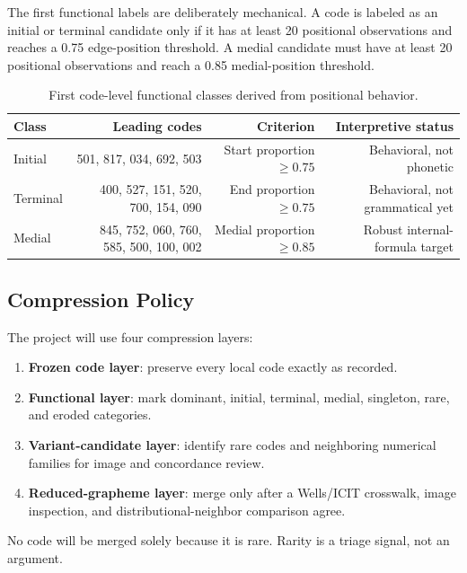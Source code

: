The first functional labels are deliberately mechanical. A code is labeled as an initial or terminal candidate only if it has at least 20 positional observations and reaches a 0.75 edge-position threshold. A medial candidate must have at least 20 positional observations and reach a 0.85 medial-position threshold.

\begin{table}[htbp]
\centering
\begin{tabular}{lrrr}
\toprule
\textbf{Class} & \textbf{Leading codes} & \textbf{Criterion} & \textbf{Interpretive status} \\
\midrule
Initial & 501, 817, 034, 692, 503 & Start proportion $\geq 0.75$ & Behavioral, not phonetic \\
Terminal & 400, 527, 151, 520, 700, 154, 090 & End proportion $\geq 0.75$ & Behavioral, not grammatical yet \\
Medial & 845, 752, 060, 760, 585, 500, 100, 002 & Medial proportion $\geq 0.85$ & Robust internal-formula target \\
\bottomrule
\end{tabular}
\caption{First code-level functional classes derived from positional behavior.}
\label{tab:functional-classes}
\end{table}

\subsection{Compression Policy}

The project will use four compression layers:

\begin{enumerate}
  \item \textbf{Frozen code layer}: preserve every local code exactly as recorded.
  \item \textbf{Functional layer}: mark dominant, initial, terminal, medial, singleton, rare, and eroded categories.
  \item \textbf{Variant-candidate layer}: identify rare codes and neighboring numerical families for image and concordance review.
  \item \textbf{Reduced-grapheme layer}: merge only after a Wells/ICIT crosswalk, image inspection, and distributional-neighbor comparison agree.
\end{enumerate}

No code will be merged solely because it is rare. Rarity is a triage signal, not an argument.


